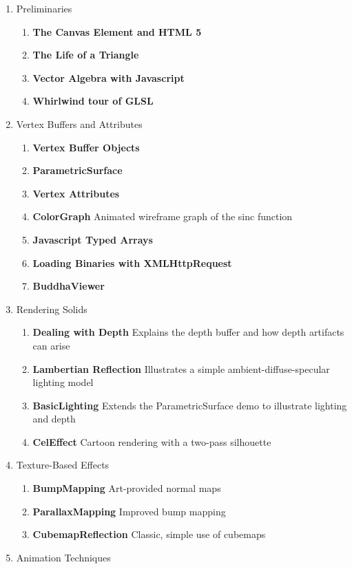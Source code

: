 \setcounter{recipei}{0}
\newcommand{\verbiage}[2] {\item \textbf{\textcolor{commentgreen}{#1}} \footnotesize#2\normalsize}
\newcommand{\rrecipe}[2] {\item \textbf{\textcolor{commentgreen}{#1}} \footnotesize#2\normalsize}
\newcommand{\irecipe}[2] {\item \textbf{\textcolor{commentgreen}{#1}} \footnotesize#2\normalsize}
\newcommand{\arecipe}[2] {\item \textbf{\textcolor{commentgreen}{#1}} \footnotesize#2\normalsize}
\renewcommand{\labelenumi}{}
\begin{enumerate}

\item Preliminaries
\begin{enumerate}[resume]
\verbiage{The Canvas Element and HTML 5}{}
\verbiage{The Life of a Triangle}{}
\verbiage{Vector Algebra with Javascript}{}
\verbiage{Whirlwind tour of GLSL}{}
\end{enumerate}
%
\item Vertex Buffers and Attributes
\begin{enumerate}[resume]
\verbiage{Vertex Buffer Objects}{}
\rrecipe{ParametricSurface}{}
\verbiage{Vertex Attributes}{}
\rrecipe{ColorGraph}{Animated wireframe graph of the sinc function} %
\verbiage{Javascript Typed Arrays}{}
\verbiage{Loading Binaries with XMLHttpRequest}{}
\rrecipe{BuddhaViewer}{}
\end{enumerate}
%
\item Rendering Solids
\begin{enumerate}[resume]
\verbiage{Dealing with Depth}{Explains the depth buffer and how depth artifacts can arise}
\verbiage{Lambertian Reflection}{Illustrates a simple ambient-diffuse-specular lighting model}
\rrecipe{BasicLighting}{Extends the ParametricSurface demo to illustrate lighting and depth}
\rrecipe{CelEffect}{Cartoon rendering with a two-pass silhouette}
\end{enumerate}
%
\item Texture-Based Effects
\begin{enumerate}[resume]
\rrecipe{BumpMapping}{Art-provided normal maps} %
\rrecipe{ParallaxMapping}{Improved bump mapping}
\rrecipe{CubemapReflection}{Classic, simple use of cubemaps} %
\end{enumerate}
%
\item Animation Techniques
\begin{enumerate}[resume]

\end{enumerate}
\end{enumerate}
